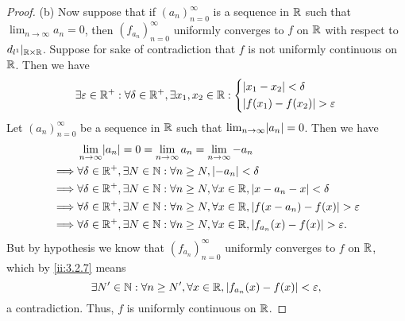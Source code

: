 \begin{proof}{(b)}
  Now suppose that if \((a_n)_{n = 0}^\infty\) is a sequence in \(\mathbb{R}\) such that \(\lim_{n \to \infty} a_n = 0\), then \((f_{a_n})_{n = 0}^\infty\) uniformly converges to \(f\) on \(\mathbb{R}\) with respect to \(d_{l^1}|_{\mathbb{R} \times \mathbb{R}}\).
  Suppose for sake of contradiction that \(f\) is not uniformly continuous on \(\mathbb{R}\).
  Then we have
  \[
    \exists \varepsilon \in \mathbb{R}^+ : \forall \delta \in \mathbb{R}^+, \exists x_1, x_2 \in \mathbb{R} : \begin{dcases}
      \left\lvert x_1 - x_2\right\rvert < \delta \\
      \left\lvert f(x_1) - f(x_2)\right\rvert > \varepsilon
    \end{dcases}
  \]
  Let \((a_n)_{n = 0}^\infty\) be a sequence in \(\mathbb{R}\) such that \(\lim_{n \to \infty} \abs{a_n} = 0\).
  Then we have
  \begin{align*}
             & \lim_{n \to \infty} \abs{a_n} = 0 = \lim_{n \to \infty} a_n = \lim_{n \to \infty} -a_n                                 \\
    \implies & \forall \delta \in \R^+, \exists N \in \N : \forall n \geq N, \abs{-a_n} < \delta                                      \\
    \implies & \forall \delta \in \R^+, \exists N \in \N : \forall n \geq N, \forall x \in \R, \abs{x - a_n - x} < \delta             \\
    \implies & \forall \delta \in \R^+, \exists N \in \N : \forall n \geq N, \forall x \in \R, \abs{f(x - a_n) - f(x)} > \varepsilon  \\
    \implies & \forall \delta \in \R^+, \exists N \in \N : \forall n \geq N, \forall x \in \R, \abs{f_{a_n}(x) - f(x)} > \varepsilon.
  \end{align*}
  But by hypothesis we know that \((f_{a_n})_{n = 0}^\infty\) uniformly converges to \(f\) on \(\mathbb{R}\), which by \cref{ii:3.2.7} means
  \[
    \exists N' \in \mathbb{N} : \forall n \geq N', \forall x \in \mathbb{R}, \left\lvert f_{a_n}(x) - f(x)\right\rvert < \varepsilon,
  \]
  a contradiction.
  Thus, \(f\) is uniformly continuous on \(\mathbb{R}\).
\end{proof}

